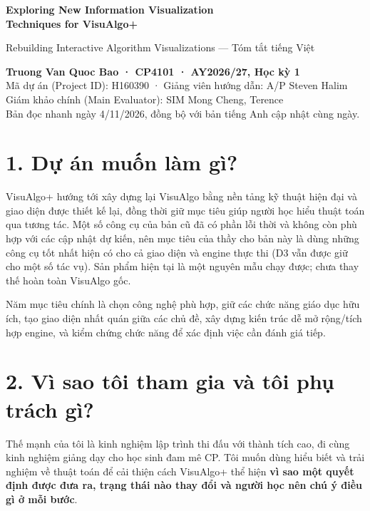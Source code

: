 \documentclass[11pt,a4paper]{article}
\begin{document}
{\LARGE\bfseries\color{navy}Exploring New Information Visualization\\Techniques for VisuAlgo+\par}
\vspace{1mm}
{\large Rebuilding Interactive Algorithm Visualizations --- Tóm tắt tiếng Việt\par}
\vspace{1mm}
\textbf{Truong Van Quoc Bao · CP4101 · AY2026/27, Học kỳ 1}\\
Mã dự án (Project ID): H160390 · Giảng viên hướng dẫn: A/P Steven Halim\\
Giám khảo chính (Main Evaluator): SIM Mong Cheng, Terence\\
Bản đọc nhanh ngày 4/11/2026, đồng bộ với bản tiếng Anh cập nhật cùng ngày.

\section*{1. Dự án muốn làm gì?}
VisuAlgo+ hướng tới xây dựng lại VisuAlgo bằng nền tảng kỹ thuật hiện đại và giao diện được thiết kế lại, đồng thời giữ mục tiêu giúp người học hiểu thuật toán qua tương tác. Một số công cụ của bản cũ đã có phần lỗi thời và không còn phù hợp với các cập nhật dự kiến, nên mục tiêu của thầy cho bản này là dùng những công cụ tốt nhất hiện có cho cả giao diện và engine thực thi (D3 vẫn được giữ cho một số tác vụ). Sản phẩm hiện tại là một nguyên mẫu chạy được; chưa thay thế hoàn toàn VisuAlgo gốc.

Năm mục tiêu chính là chọn công nghệ phù hợp, giữ các chức năng giáo dục hữu ích, tạo giao diện nhất quán giữa các chủ đề, xây dựng kiến trúc dễ mở rộng/tích hợp engine, và kiểm chứng chức năng để xác định việc cần đánh giá tiếp.

\section*{2. Vì sao tôi tham gia và tôi phụ trách gì?}
Thế mạnh của tôi là kinh nghiệm lập trình thi đấu với thành tích cao, đi cùng kinh nghiệm giảng dạy cho học sinh đam mê CP. Tôi muốn dùng hiểu biết và trải nghiệm về thuật toán để cải thiện cách VisuAlgo+ thể hiện \textbf{vì sao một quyết định được đưa ra, trạng thái nào thay đổi và người học nên chú ý điều gì ở mỗi bước}.
\end{document}
